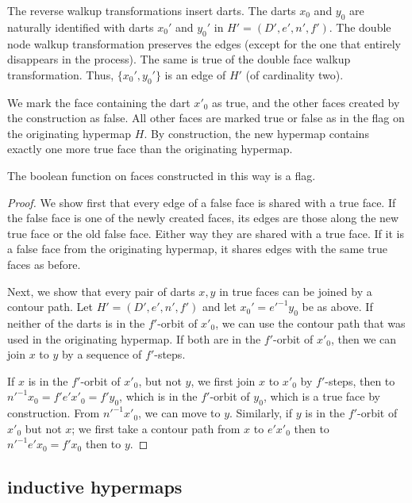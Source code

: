 The reverse walkup transformations insert darts.  The darts $x_0$ and
$y_0$ are naturally identified with darts $x_0'$ and $y_0'$ in $H'=(D',e',n',f')$.
The double node walkup transformation preserves the edges (except for
the one that entirely disappears in the process).  The same is true of the
double face walkup transformation.  Thus, $\{x_0',y_0'\}$ is an edge of
$H'$ (of cardinality two).

We mark the face containing the dart $x'_0$ as true, and the other
faces created by the construction as false.   All other faces are
marked true or false as in the flag on the originating hypermap $H$.  By
construction, the new hypermap contains exactly one more true face
than the originating hypermap.

\begin{lemma}\label{lemma:flag} 
The boolean function on faces constructed in this way is a
flag.
\end{lemma}

\begin{proof}  We show first that every edge of a false face is shared
with a true face.  If the false face is one of the newly created
faces, its edges are those along the new true face or the old false
face. Either way they are shared with a true face.   If it is a
false face from the originating hypermap, it shares edges with the
same true faces as before.

Next, we show that every pair of darts $x,y$ in true faces can be
joined by a contour path.  Let $H'=(D',e',n',f')$ and let
$x_0' = e'^{-1} y_0$ be as above.  If neither of the darts is in the
$f'$-orbit of $x'_0$, we can use the contour path that was used in the
originating hypermap.  If both are in the $f'$-orbit of $x'_0$, then
we can join $x$ to $y$ by a sequence of $f'$-steps.

If $x$ is in the $f'$-orbit of $x'_0$, but not $y$, we first join $x$
to $x'_0$ by $f'$-steps, then to $n'^{-1} x_0 = f' e' x'_0 = f' y_0$, 
which is in
the $f'$-orbit of $y_0$, which is a true face by construction.
From $n'^{-1} x'_0$, we can move to $y$.
Similarly, if $y$ is in the $f'$-orbit of $x'_0$ but not $x$; we first
take a contour path from $x$ to $e' x'_0$ then to $n'^{-1} e' x_0 = f'
x_0$ then to $y$.
\end{proof}

\subsection{inductive hypermaps}


